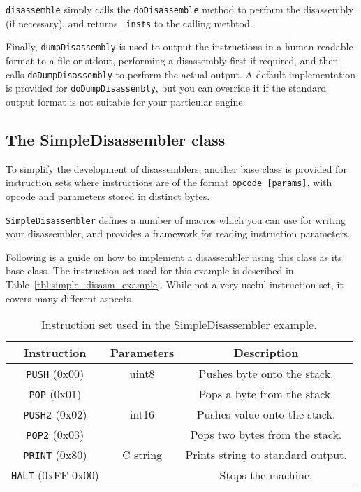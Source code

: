 \verb+disassemble+ simply calls the \verb+doDisassemble+ method to perform the disassembly (if necessary), and returns \verb+_insts+ to the calling methtod.

Finally, \verb+dumpDisassembly+ is used to output the instructions in a human-readable format to a file or stdout, performing a disassembly first if required, and then calls \verb+doDumpDisassembly+ to perform the actual output. A default implementation is provided for \verb+doDumpDisassembly+, but you can override it if the standard output format is not suitable for your particular engine.

\subsection{The SimpleDisassembler class}
\label{sec:simpledisasm}
To simplify the development of disassemblers, another base class is provided for instruction sets where instructions are of the format \verb+opcode [params]+, with opcode and parameters stored in distinct bytes.

\verb+SimpleDisassembler+ defines a number of macros which you can use for writing your disassembler, and provides a framework for reading instruction parameters.

Following is a guide on how to implement a disassembler using this class as its base class. The instruction set used for this example is described in Table~\vref{tbl:simple_disasm_example}. While not a very useful instruction set, it covers many different aspects.

\begin{table}[!hpbt]
\centering
\begin{tabular}{c | c | c}
Instruction & Parameters & Description \\
\hline
\verb+PUSH+ (0x00) & uint8 & Pushes byte onto the stack.\\
\verb+POP+ (0x01) & &  Pops a byte from the stack. \\
\verb+PUSH2+ (0x02) & int16 & Pushes value onto the stack.\\
\verb+POP2+ (0x03) & &  Pops two bytes from the stack. \\
\verb+PRINT+ (0x80) & C string & Prints string to standard output. \\
\verb+HALT+ (0xFF 0x00) & & Stops the machine.
\end{tabular}
\caption{Instruction set used in the SimpleDisassembler example.}
\label{tbl:simple_disasm_example}
\end{table}

